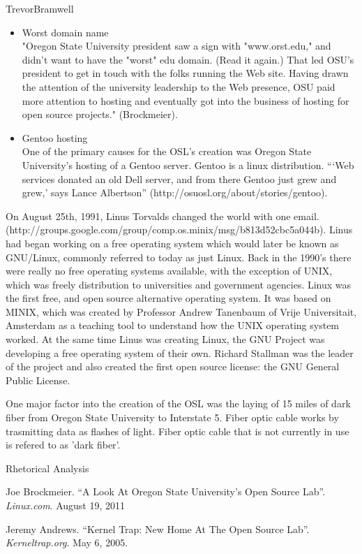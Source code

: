 \documentclass[12pt,letterpaper]{article}
\begin{document}
\begin{mla}{Trevor}{Bramwell}
\begin{itemize}
    \item Worst domain name \\
        "Oregon State University president saw a sign with "www.orst.edu," and didn't
        want to have the "worst" edu domain. (Read it again.) That led OSU's president
        to get in touch with the folks running the Web site. Having drawn the attention
        of the university leadership to the Web presence, OSU paid more attention to
        hosting and eventually got into the business of hosting for open source
        projects." (Brockmeier).

    \item Gentoo hosting \\
        \tab One of the primary causes for the OSL's creation was Oregon State University's
        hosting of a Gentoo server. Gentoo is a linux distribution. ```Web services
        donated an old Dell server, and from there Gentoo just grew and grew,' says
        Lance Albertson'' (http://osuosl.org/about/stories/gentoo).
\end{itemize}

On August 25th, 1991, Linus Torvalds changed the world with one email. 
(http://groups.google.com/group/comp.os.minix/msg/b813d52cbc5a044b). Linus had
began working on a free operating system which would later be known as
GNU/Linux, commonly referred to today as just Linux. Back in the 1990's there
were really no free operating systems available, with the exception of UNIX,
which was freely distribution to universities and government agencies. Linux 
was the first free, and open source alternative operating system. It was based 
on MINIX, which was created by Professor Andrew Tanenbaum of Vrije 
Universitait, Amsterdam as a teaching tool to understand how the UNIX 
operating system worked. At the same time Linus was creating Linux, the GNU
Project was developing a free operating system of their own. Richard Stallman
was the leader of the project and also created the first open source license:
the GNU General Public License.

One major factor into the creation of the OSL was the laying of 15 miles of
dark fiber from Oregon State University to Interstate 5. Fiber optic cable
works by trasmitting data as flashes of light. Fiber optic cable that is not 
currently in use is refered to as 'dark fiber'. 


\pagebreak
{\centering Rhetorical Analysis\\}

\begin{workscited}
\bibent
Joe Brockmeier. ``A Look At Oregon State University's Open Source Lab''.
    \emph{Linux.com}. August 19, 2011

\bibent
Jeremy Andrews. ``Kernel Trap: New Home At The Open Source Lab''.
    \emph{Kerneltrap.org}. May 6, 2005.
\end{workscited}
\end{mla}
\end{document}
